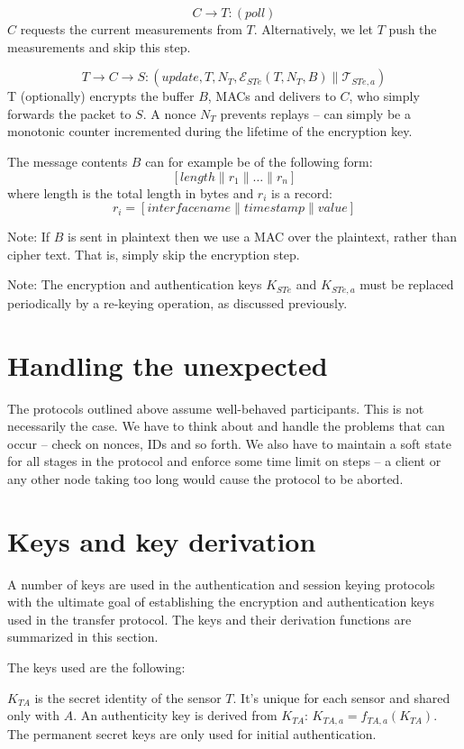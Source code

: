 \documentclass[10pt,a4paper]{article}
\begin{document}
\[
C \rightarrow T: (\textit{poll})
\]
$C$ requests the current measurements from $T$. Alternatively, we let $T$ push the measurements and skip this step.

\[
T \rightarrow C \rightarrow S: (\textit{update},T,N_T,\mathcal{E}_{STe}(T,N_T,B) \parallel \mathcal{T}_{STe,a})
\]
T (optionally) encrypts the buffer $B$, MACs and delivers to $C$, who simply forwards the packet to $S$. A nonce $N_T$ prevents replays -- can simply be a monotonic counter incremented during the lifetime of the encryption key.

The message contents $B$ can for example be of the following form:
\[
[length \parallel r_1 \parallel \dots \parallel r_n ]
\]
where length is the total length in bytes and $r_i$ is a record:
\[
r_i = [interface name \parallel timestamp \parallel value ]
\]

Note: If $B$ is sent in plaintext then we use a MAC over the plaintext, rather than cipher text. That is, simply skip the encryption step.

Note: The encryption and authentication keys $K_{STe}$ and $K_{STe,a}$ must be replaced periodically by a re-keying operation, as discussed previously.

\section{Handling the unexpected}

The protocols outlined above assume well-behaved participants. This is not necessarily the case. We have to think about and handle the problems that can occur -- check on nonces, IDs and so forth. We also have to maintain a soft state for all stages in the protocol and enforce some time limit on steps -- a client or any other node taking too long would cause the protocol to be aborted.


\section{Keys and key derivation}

A number of keys are used in the authentication and session keying protocols with the ultimate goal of establishing the encryption and authentication keys used in the transfer protocol. The keys and their derivation functions are summarized in this section.

The keys used are the following:

$K_{TA}$ is the secret identity of the sensor $T$. It's unique for each sensor and shared only with $A$. An authenticity key is derived from $K_{TA}$: $K_{TA,a} = f_{TA,a}(K_{TA})$. The permanent secret keys are only used for initial authentication.
\end{document}
